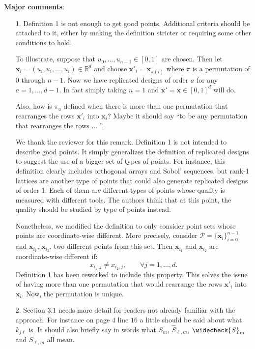 \documentclass[10pt,a4paper]{article}
\newcommand{\vect}[1]{\boldsymbol{\mathbf{#1}}}
\newcommand{\vx}{\vect{x}}
\newcommand{\hS}{\widehat{S}}
\newcommand{\tS}{\widetilde{S}}
\newcommand{\wcS}{\widecheck{S}}
\begin{document}
\textbf{Major comments}:
\begin{itemize}
\item[1.] Definition 1 is not enough to get good points. Additional criteria should be attached to it, either by making the definition stricter or requiring some
other conditions to hold.

To illustrate, suppose that $u_0,\dots,u_{n-1} \in [0,1]$ are chosen. Then let $\vx_i = (u_i, u_i, \dots,u_i) \in \mathbb{R}^d$ and choose $\vx'_i= \vx_{\pi(i)}$ where $\pi$ is a permutation
of $0$ through $n-1$. Now we have replicated designs of order $a$ for any $a = 1,\dots,d-1$. In fact simply taking $n = 1$ and $\vx'=\vx \in [0,1]^d$ will do.

Also, how is $\pi_u$ defined when there is more than one permutation that rearranges the rows $\vx'_i$ into $\vx_i$? Maybe it should say ``to be any permutation
that rearranges the rows ... ''.

{\color{blue} We thank the reviewer for this remark. Definition 1 is not intended to describe good points. It simply generalizes the definition of replicated designs to suggest the use of a bigger set of types of points. For instance, this definition clearly includes orthogonal arrays and Sobol' sequences, but rank-1 lattices are another type of points that could also generate replicated designs of order 1. Each of them are different types of points whose quality is measured with different tools. The authors think that at this point, the quality should be studied by type of points instead.

Nonetheless, we modified the definition to only consider point sets whose points are coordinate-wise different. More precisely, consider $\mathcal{P}=\{\vx_i\}_{i=0}^{n-1}$ and $\vx_{i_1}$, $\vx_{i_2}$, two different points from this set. Then $\vx_{i_1}$ and $\vx_{i_2}$ are coordinate-wise different if: 
$$ x_{i_1,j} \neq x_{i_2,j}, \qquad \forall j=1,\dots,d .$$
Definition 1 has been reworked to include this property. This solves the issue of having more than one permutation that would rearrange the rows $\vx'_i$ into $\vx_i$. Now, the permutation is unique.}




\item[2.] Section $3.1$ needs more detail for readers not already familiar with the approach. For instance on page $4$ line $16$ a little should be said about what $k_{j\ell}$ is. It should also briefly say in words what $S_m$, $\hS_{\ell,m}$, $\wcS_m$ and $\tS_{\ell,m}$ all mean.


\end{itemize}
\end{document}

